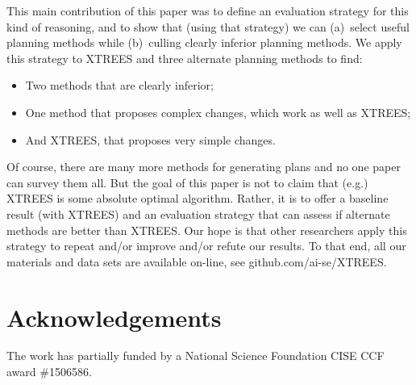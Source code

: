 \documentclass{sig-alternate}
\newcommand{\bi}{\begin{itemize}}
\newcommand{\ei}{\end{itemize}}
\begin{document}
This main contribution of this paper was to  define an evaluation strategy for this kind of reasoning, and to show that (using that strategy) we
can (a)~select useful planning methods while (b)~culling clearly
inferior planning methods. 
We apply this strategy to XTREES and three alternate planning methods to find:
\bi
\item Two methods that are clearly inferior;
\item One method that proposes complex changes, which work as well as XTREES;
\item And XTREES, that proposes very simple changes.
\ei
Of course, there are many more methods for generating plans and
no   one paper can survey them all.
But the goal of this paper is not to claim that (e.g.) XTREES is some absolute optimal algorithm. Rather, it is
to offer a baseline result (with XTREES) and an  evaluation strategy that  can assess  if alternate methods are better than XTREES.
Our hope is that other   researchers apply this strategy  to repeat and/or improve
and/or refute our results. To that end, all our materials and data sets are available on-line, see
github.com/ai-se/XTREES.


\section*{Acknowledgements}
The work has partially funded by a National Science Foundation CISE CCF award \#1506586.



\end{document}
